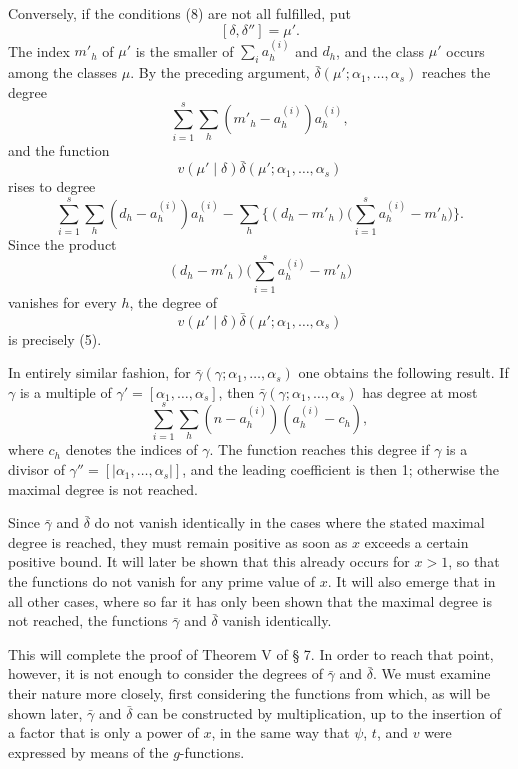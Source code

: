 \documentclass[11pt,a4paper]{article}
\begin{document}
Conversely, if the conditions (8) are not all fulfilled, put
\[
 [\delta,\delta'']=\mu'.
\]
The index $m'_h$ of $\mu'$ is the smaller of $\sum_i a_h^{(i)}$ and $d_h$, and the class $\mu'$ occurs among the classes $\mu$. By the preceding argument, $\bar\delta(\mu';\alpha_1,
\ldots,\alpha_s)$ reaches the degree
\[
 \sum_{i=1}^s\sum_h(m'_h-a_h^{(i)})a_h^{(i)},
\]
and the function
\[
 v(\mu'\mid\delta)\bar\delta(\mu';\alpha_1,
\ldots,\alpha_s)
\]
rises to degree
\[
 \sum_{i=1}^s\sum_h(d_h-a_h^{(i)})a_h^{(i)}
 -\sum_h\biggl\{(d_h-m'_h)\biggl(\sum_{i=1}^s a_h^{(i)}-m'_h\biggr)\biggr\}.
\]
Since the product
\[
 (d_h-m'_h)\biggl(\sum_{i=1}^s a_h^{(i)}-m'_h\biggr)
\]
vanishes for every $h$, the degree of
\[
 v(\mu'\mid\delta)\bar\delta(\mu';\alpha_1,
\ldots,\alpha_s)
\]
is precisely (5).

In entirely similar fashion, for $\bar\gamma(\gamma;\alpha_1,
\ldots,\alpha_s)$ one obtains the following result. If $\gamma$ is a multiple of $\gamma'=[\alpha_1,
\ldots,\alpha_s]$, then $\bar\gamma(\gamma;\alpha_1,
\ldots,\alpha_s)$ has degree at most
\begin{equation}
 \sum_{i=1}^s\sum_h(n-a_h^{(i)})(a_h^{(i)}-c_h),
\tag{10}
\end{equation}
where $c_h$ denotes the indices of $\gamma$. The function reaches this degree if $\gamma$ is a divisor of $\gamma''=[|\alpha_1,
\ldots,\alpha_s|]$, and the leading coefficient is then 1; otherwise the maximal degree is not reached.

Since $\bar\gamma$ and $\bar\delta$ do not vanish identically in the cases where the stated maximal degree is reached, they must remain positive as soon as $x$ exceeds a certain positive bound. It will later be shown that this already occurs for $x>1$, so that the functions do not vanish for any prime value of $x$. It will also emerge that in all other cases, where so far it has only been shown that the maximal degree is not reached, the functions $\bar\gamma$ and $\bar\delta$ vanish identically.

This will complete the proof of Theorem V of § 7. In order to reach that point, however, it is not enough to consider the degrees of $\bar\gamma$ and $\bar\delta$. We must examine their nature more closely, first considering the functions from which, as will be shown later, $\bar\gamma$ and $\bar\delta$ can be constructed by multiplication, up to the insertion of a factor that is only a power of $x$, in the same way that $\psi$, $t$, and $v$ were expressed by means of the $g$-functions.
\end{document}
